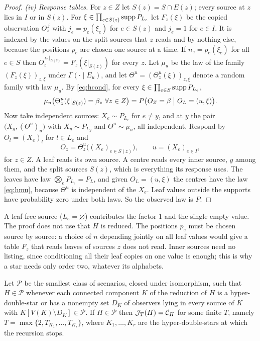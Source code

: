 \begin{proof}
\emph{(iv) Response tables.} For $z\in Z$ let $S(z)=S\cap E(z)$; every source at $z$ lies in $I$ or in $S(z)$. For $\xi\in\prod_{e\in S(z)}\operatorname{supp} P_{L_e}$ let $F_z(\xi)$ be the copied observation $O_z^{\,j}$ with $j_e=p_e(\xi_e)$ for $e\in S(z)$ and $j_e=1$ for $e\in I$. It is indexed by the values on the split sources that $z$ reads and by nothing else, because the positions $p_e$ are chosen one source at a time. If $n_e=p_e(\xi_e)$ for all $e\in S$ then $O_z^{\,\iota_n|_{E(z)}}=F_z(\xi|_{S(z)})$ for every $z$. Let $\mu_u$ be the law of the family $(F_z(\xi))_{z,\xi}$ under $\Gamma(\cdot\mid E_u)$, and let $\Theta^u=(\Theta^u_z(\xi))_{z,\xi}$ denote a random family with law $\mu_u$. By \eqref{eq:hcond}, for every $\xi\in\prod_{e\in S}\operatorname{supp} P_{L_e}$,
\begin{equation}\label{eq:hmu}
\mu_u\bigl(\Theta^u_z(\xi|_{S(z)})=\beta_z\ \forall z\in Z\bigr)=P\bigl(O_Z=\beta\bigm|O_L=(u,\xi)\bigr).
\end{equation}
Now take independent sources: $X_e\sim P_{L_e}$ for $e\ne y$, and at $y$ the pair $\bigl(X_y,(\Theta^u)_u\bigr)$ with $X_y\sim P_{L_y}$ and $\Theta^u\sim\mu_u$, all independent. Respond by $O_l=(X_e)_l$ for $l\in L_e$ and
\[
O_z=\Theta^{u}_z\bigl((X_e)_{e\in S(z)}\bigr),\qquad u=(X_e)_{e\in I},
\]
for $z\in Z$. A leaf reads its own source. A centre reads every inner source, $y$ among them, and the split sources $S(z)$, which is everything its response uses. The leaves have law $\bigotimes_eP_{L_e}=P_L$, and given $O_L=(u,\xi)$ the centres have the law \eqref{eq:hmu}, because $\Theta^u$ is independent of the $X_e$. Leaf values outside the supports have probability zero under both laws. So the observed law is $P$.
\end{proof}

A leaf-free source ($L_e=\varnothing$) contributes the factor $1$ and the single empty value. The proof does not use that $H$ is reduced. The positions $p_e$ must be chosen source by source: a choice of $n$ depending jointly on all leaf values would give a table $F_z$ that reads leaves of sources $z$ does not read. Inner sources need no listing, since conditioning all their leaf copies on one value is enough; this is why a star needs only order two, whatever its alphabets.

\begin{corollary}[Peeling]\label{cor:hpeel}
Let $\mathcal P$ be the smallest class of scenarios, closed under isomorphism, such that $H\in\mathcal P$ whenever each connected component $K$ of the reduction of $H$ is a hyper-double-star or has a nonempty set $D_K$ of observers lying in every source of $K$ with $K[V(K)\setminus D_K]\in\mathcal P$. If $H\in\mathcal P$ then $\mathcal J_T(H)=\mathcal C_{H}$ for some finite $T$, namely $T=\max\{2,T_{K_1},\dots,T_{K_r}\}$, where $K_1,\dots,K_r$ are the hyper-double-stars at which the recursion stops.
\end{corollary}

